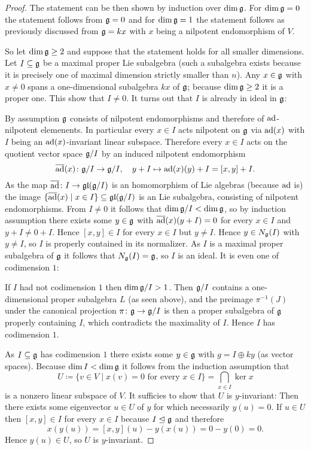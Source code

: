 \begin{proof}
 The statement can be then shown by induction over $\dim \mathfrak{g}$. For $\dim \mathfrak{g} = 0$ the statement follows from $\mathfrak{g} = 0$ and for $\dim \mathfrak{g} = 1$ the statement follows as previously discussed from $\mathfrak{g} = k x$ with $x$ being a nilpotent endomorphism of $V$.
 
 So let $\dim \mathfrak{g} \geq 2$ and suppose that the statement holds for all smaller dimensions. Let $I \subseteq \mathfrak{g}$ be a maximal proper Lie subalgebra (such a subalgebra exists because it is precisely one of maximal dimension strictly smaller than $n$). Any $x \in \mathfrak{g}$ with $x \neq 0$ spans a one-dimensional subalgebra $k x$ of $\mathfrak{g}$; because $\dim \mathfrak{g} \geq 2$ it is a proper one. This show that $I \neq 0$. It turns out that $I$ is already in ideal in $\mathfrak{g}$:
 
 By assumption $\mathfrak{g}$ consists of nilpotent endomorphisms and therefore of $\operatorname{ad}$-nilpotent elemenents. In particular every $x \in I$ acts nilpotent on $\mathfrak{g}$ via $\operatorname{ad}(x)$ with $I$ being an $\operatorname{ad}(x)$-invariant linear subspace. Therefore every $x \in I$ acts on the quotient vector space $\mathfrak{g}/I$ by an induced nilpotent endomorphism
 \[
  \overline{\operatorname{ad}}(x) \colon \mathfrak{g}/I \to \mathfrak{g}/I, \quad y + I \mapsto \operatorname{ad}(x)(y) + I = [x,y] + I.
 \]
 As the map $\overline{\operatorname{ad}} \colon I \to \mathfrak{gl}(\mathfrak{g}/I)$ is an homomorphism of Lie algebras (because $\operatorname{ad}$ is) the image $\{\overline{\operatorname{ad}}(x) \mid x \in I\} \subseteq \mathfrak{gl}(\mathfrak{g}/I)$ is an Lie subalgebra, consisting of nilpotent endomorphisms. From $I \neq 0$ it follows that $\dim \mathfrak{g}/I < \dim \mathfrak{g}$, so by induction assumption there exists some $y \in \mathfrak{g}$ with $\overline{\operatorname{ad}}(x)(y+I) = 0$ for every $x \in I$ and $y+I \neq 0+I$. Hence $[x,y] \in I$ for every $x \in I$ but $y \neq I$. Hence $y \in N_{\mathfrak{g}}(I)$ with $y \neq I$, so $I$ is properly contained in its normalizer. As $I$ is a maximal proper subalgebra of $\mathfrak{g}$ it follows that $N_{\mathfrak{g}}(I) = \mathfrak{g}$, so $I$ is an ideal. It is even one of codimension $1$:
 
 If $I$ had not codimension $1$ then $\dim \mathfrak{g}/I > 1$. Then $\mathfrak{g}/I$ contains a one-dimensional proper subalgebra $L$ (as seen above), and the preimage $\pi^{-1}(J)$ under the canonical projection $\pi \colon \mathfrak{g} \to \mathfrak{g}/I$ is then a proper subalgebra of $\mathfrak{g}$ properly containing $I$, which contradicts the maximality of $I$. Hence $I$ has codimension $1$.
 
 As $I \subseteq \mathfrak{g}$ has codimension $1$ there exists some $y \in \mathfrak{g}$ with $g = I \oplus ky$ (as vector spaces). Because $\dim I < \dim \mathfrak{g}$ it follows from the induction assumption that
 \[
  U \coloneqq \{v \in V \mid \text{$x(v) = 0$ for every $x \in I$}\} = \bigcap_{x \in I} \ker x
 \]
 is a nonzero linear subspace of $V$. It sufficies to show that $U$ is $y$-invariant: Then there exists some eigenvector $u \in U$ of $y$ for which necessarily $y(u) = 0$. If $u\in U$ then $[x,y] \in I$ for every $x \in I$ because $I \trianglelefteq \mathfrak{g}$ and therefore
 \[
  x(y(u)) = [x,y](u) - y(x(u)) = 0 - y(0) = 0.
 \]
 Hence $y(u) \in U$, so $U$ is $y$-invariant.
\end{proof}


